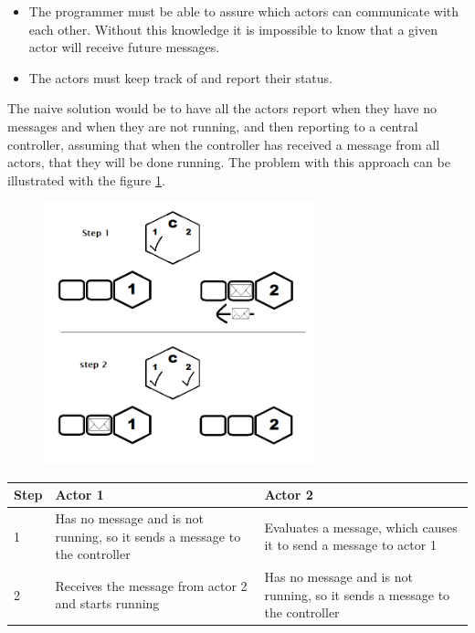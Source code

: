 \begin{itemize}
\item The programmer must be able to assure which actors can communicate with each other. Without this knowledge it is impossible to know that a given actor will receive future messages.
\item The actors must keep track of and report their status.
\end{itemize} 

The naive solution would be to have all the actors report when they have no messages and when they are not running, and then reporting to a central controller, assuming that when the controller has received a message from all actors, that they will be done running. The problem with this approach can be illustrated with the figure \cref{iterationproblem_img}. 

\begin{figure}[htbp]
\centering
\includegraphics[width=0.7\textwidth]{Analysis/Supercomputing/iterationproblem.png}\label{iterationproblem_img}
\end{figure}

\begin{tabular}{ | p{1cm} | p{6cm} | p{6cm} | }%
\hline
Step & Actor 1 & Actor 2 \\\hline
1 & Has no message and is not running, so it sends a message to the controller & Evaluates a message, which causes it to send a message to actor 1 \\\hline
2 & Receives the message from actor 2 and starts running & Has no message and is not running, so it sends a message to the controller \\\hline
\end{tabular}

